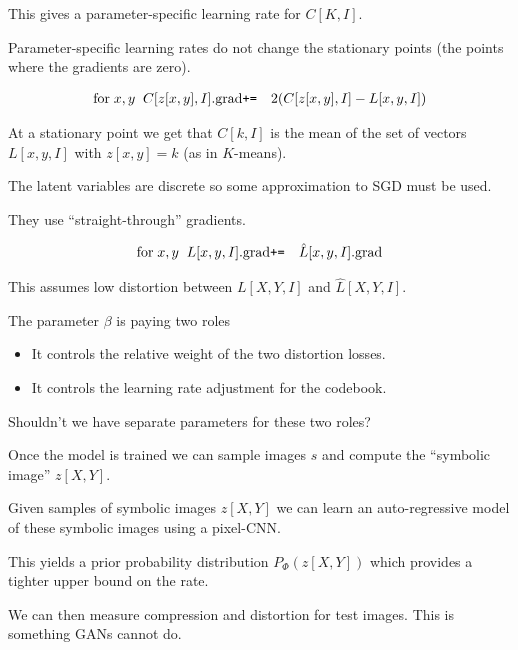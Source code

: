 {\vfill
This gives a parameter-specific learning rate for $C[K,I]$.

\vfill
Parameter-specific learning rates do not change the stationary points (the points where the gradients are zero).


\begin{eqnarray*}
\mathrm{for}\;x,y\;\;C[z[x,y],I].\mathrm{grad} & \mbox{\tt +=} & 2(C[z[x,y],I] - L[x,y,I])
\end{eqnarray*}

\vfill
At a stationary point we get that $C[k,I]$ is the mean of the set of vectors $L[x,y,I]$ with $z[x,y] = k$ (as in $K$-means).


The latent variables are discrete so some approximation to SGD must be used.

\vfill
They use ``straight-through'' gradients.

\begin{eqnarray*}
\mathrm{for}\;x,y\;\;L[x,y,I].\mathrm{grad} & \mbox{\tt +=} & \hat{L}[x,y,I].\mathrm{grad}
\end{eqnarray*}

\vfill
This assumes low distortion between $L[X,Y,I]$ and $\hat{L}[X,Y,I]$.


The parameter $\beta$ is paying two roles

\vfill
\begin{itemize}
\item It controls the relative weight of the two distortion losses.

\vfill
\item It controls the learning rate adjustment for the codebook.
\end{itemize}

\vfill
Shouldn't we have separate parameters for these two roles?


Once the model is trained we can sample images $s$ and compute the ``symbolic image'' $z[X,Y]$.

\vfill
Given samples of symbolic images $z[X,Y]$ we can learn an auto-regressive model of these symbolic images using a pixel-CNN.

\vfill
This yields a prior probability distribution $P_\Phi(z[X,Y])$ which provides a tighter upper bound on the rate.

\vfill
We can then measure compression and distortion for test images.  This is something GANs cannot do.

}
